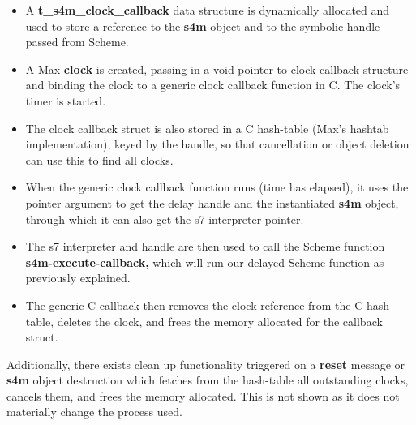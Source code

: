 \documentclass[acmsmall, anonymous, review]{acmart}
\begin{document}
\begin{itemize}
\item A \textbf{t\_s4m\_clock\_callback} data structure is dynamically allocated and used to store a
  reference to the \textbf{s4m} object and to the symbolic handle passed from Scheme.
\item A Max \textbf{clock} is created, passing in a void pointer to clock callback structure
  and binding the clock to a generic clock callback function in C. The clock's timer is started.
\item The clock callback struct is also stored in a C hash-table (Max's hashtab implementation),
  keyed by the handle, so that cancellation or object deletion can use this to find all clocks.
\item When the generic clock callback function runs (time has elapsed), it uses the pointer argument to get 
  the delay handle and the instantiated \textbf{s4m} object, through which it 
  can also get the s7 interpreter pointer.
\item The s7 interpreter and handle are then used to call the Scheme function
  \textbf{s4m-execute-callback,} which will run our delayed Scheme function as previously explained.
\item The generic C callback then removes the clock reference from the C hash-table,
  deletes the clock, and frees the memory allocated for the callback struct.
\end{itemize}

Additionally, there exists clean up functionality triggered on a \textbf{reset} message or 
\textbf{s4m} object destruction which fetches from the hash-table all outstanding clocks, 
cancels them, and frees the memory allocated.
This is not shown as it does not materially change the process used.
\end{document}
